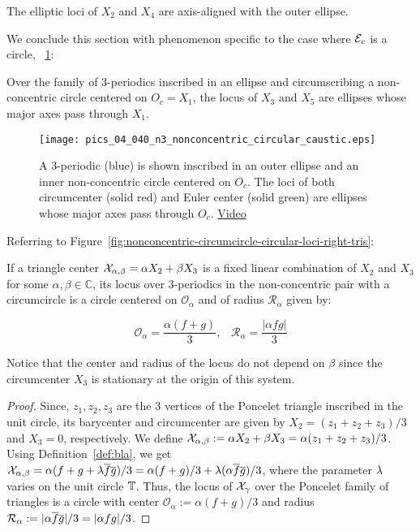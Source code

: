 \begin{observation}\label{obs:X2X4}
The elliptic loci of $X_2$ and $X_4$ are axis-aligned with the outer ellipse.
\end{observation} 

We conclude this section with phenomenon specific to the case where $\mathcal{E}_c$ is a circle,  ~\cref{fig:circular-caustic}:

\begin{observation}
 Over the family of 3-periodics inscribed in an ellipse and circumscribing a non-concentric circle centered on $O_c=X_1$, the locus of $X_3$ and $X_5$ are ellipses whose major axes pass through $X_1$.
 \end{observation}
 
\begin{figure}
    \centering
    \texttt{[image: pics\_04\_040\_n3\_nonconcentric\_circular\_caustic.eps]}
    \caption{A 3-periodic (blue) is shown inscribed in an outer ellipse and an inner non-concentric circle centered on $O_c$. The loci of both circumcenter (solid red) and Euler center (solid green) are ellipses whose major axes pass through $O_c$. \href{https://youtu.be/w7sZ5O8k4xU}{Video}}
    \label{fig:circular-caustic}
\end{figure}



Referring to Figure~\ref{fig:nonconcentric-circumcircle-circular-loci-right-tris}:

\begin{proposition}
If a triangle center $\mathcal{X}_{\alpha,\beta}=\alpha X_2+ \beta X_3$ is a fixed linear combination of $X_2$ and $X_3$ for some $\alpha,\beta\in\mathbb{C}$, its locus over 3-periodics in the non-concentric pair with a circumcircle is a circle centered on $\mathcal{O}_\alpha$ and of radius $\mathcal{R}_\alpha$ given by:

\[ \mathcal{O}_\alpha = \frac{\alpha(f+g)}{3},\;\;\; \mathcal{R}_\alpha =\frac{|\alpha f g|}{3}\]
\label{prop:LinComb-concentric}
\end{proposition}

\begin{observation}
Notice that the center and radius of the locus do not depend on $\beta$ since the circumcenter $X_3$ is stationary at the origin of this system.
\end{observation}

\begin{proof}
Since, $z_1,z_2,z_3$ are the 3 vertices of the Poncelet triangle inscribed in the unit circle, its barycenter and circumcenter are given by $X_2=(z_1+z_2+z_3)/3$ and $X_3=0$, respectively. We define $\mathcal{X}_{\alpha,\beta}:=\alpha X_2+ \beta X_3=\alpha (z_1+z_2+z_3)/3$. Using Definition~\ref{def:bla}, we get $\mathcal{X}_{\alpha,\beta}=\alpha(f+g+\lambda \overline{f}\overline{g})/3=\alpha(f+g)/3+\lambda(\alpha \overline{f}\overline{g})/3$, where the parameter $\lambda$ varies on the unit circle $\mathbb{T}$. Thus, the locus of $\mathcal{X}_{\gamma}$ over the Poncelet family of triangles is a circle with center $\mathcal{O}_{\alpha}:=\alpha(f+g)/3$ and radius $\mathcal{R}_{\alpha}:=|\alpha \overline{f}\overline{g}|/3=|\alpha f g|/3$.
\end{proof}


